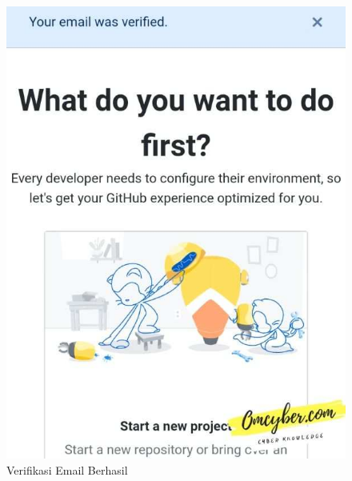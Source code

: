 \begin{enumerate}
\begin{figure}[H]
\includegraphics[scale=.25]{figures/berhasil}
\caption{Verifikasi Email Berhasil}
\label{git6}
\end{figure}
\end{enumerate}

